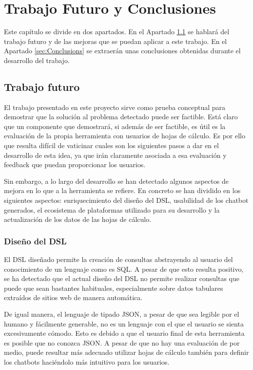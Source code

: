 \chapter{Trabajo Futuro y Conclusiones}
\label{cha:FutureWorkAndConclusions}

Este capítulo se divide en dos apartados. En el Apartado \ref{sec:FutureWork} se hablará del trabajo futuro y de las mejoras que se puedan aplicar a este trabajo. En el Apartado \ref{sec:Conclusions} se extraerán unas conclusiones obtenidas durante el desarrollo del trabajo.

\section{Trabajo futuro}
\label{sec:FutureWork}

El trabajo presentado en este proyecto sirve como prueba conceptual para demostrar que la solución al problema detectado puede ser factible. Está claro que un componente que demostrará, si además de ser factible, es útil es la evaluación de la propia herramienta con usuarios de hojas de cálculo. Es por ello que resulta difícil de vaticinar cuales son los siguientes pasos a dar en el desarrollo de esta idea, ya que irán claramente asociada a esa evaluación y feedback que puedan proporcionar los usuarios.

Sin embargo, a lo largo del desarrollo se han detectado algunos aspectos de mejora en lo que a la herramienta se refiere. En concreto se han dividido en los siguientes aspectos: enriquecimiento del diseño del DSL, usabilidad de los chatbot generados, el ecosistema de plataformas utilizado para su desarrollo y la actualización de los datos de las hojas de cálculo.

\subsection{Diseño del DSL}

El DSL diseñado permite la creación de consultas abstrayendo al usuario del conocimiento de un lenguaje como es SQL. A pesar de que esto resulta positivo, se ha detectado que el actual diseño del DSL no permite realizar consultas que puede que sean bastantes habituales, especialmente sobre datos tabulares extraídos de sitios web de manera automática.

De igual manera, el lenguaje de tipado JSON, a pesar de que sea legible por el humano y fácilmente generable, no es un lenguaje con el que el usuario se sienta excesivamente cómodo. Esto es debido a que el usuario final de esta herramienta es posible que no conozca JSON. A pesar de que no hay una evaluación de por medio, puede resultar más adecuado utilizar hojas de cálculo también para definir los chatbots haciéndolo más intuitivo para los usuarios.

